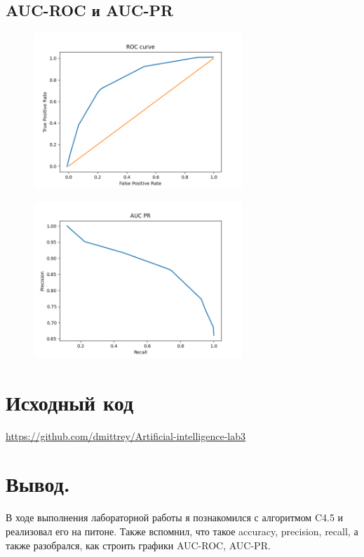 \documentclass[11pt, a4paper]{article}
\begin{document}
\subsection{AUC-ROC и AUC-PR}

\begin{figure}[ht]
  \centering
  \includegraphics[width=0.7\textwidth]{ROC.png}
\end{figure}

\newpage

\begin{figure}[ht]
  \centering
  \includegraphics[width=0.7\textwidth]{PR.png}
\end{figure}

\section{Исходный код}

 \href{https://github.com/dmittrey/Artificial-intelligence-lab3}{https://github.com/dmittrey/Artificial-intelligence-lab3}
 
\section{Вывод.}

\noindent В ходе выполнения лабораторной работы я познакомился с алгоритмом C4.5 и реализовал его на питоне. Также
вспомнил, что такое accuracy, precision, recall, а также разобрался, как строить графики AUC-ROC, AUC-PR.
\end{document}
